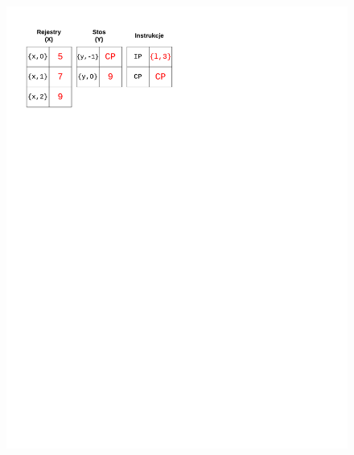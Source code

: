 \begin{figure}
\begin{multicols}{2}
\vspace{-4mm}
\begin{Figure}
 \centering
 \includegraphics[scale=0.65, clip, trim=10mm 215mm 110mm 10mm]{interpreter_max_3}
\label{fig:max3}
\end{Figure}


\end{multicols}
\end{figure}

